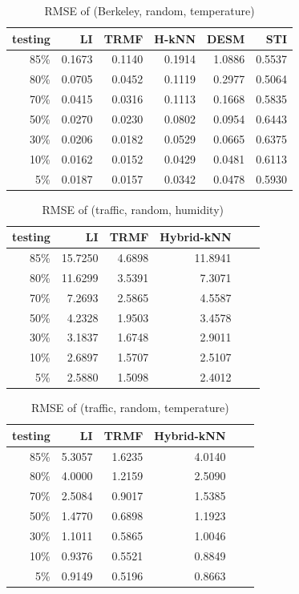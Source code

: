 \begin{table}[htbp]
\centering
\caption{RMSE of (Berkeley, random, temperature)}
\label{table:berkeley_random_tem}
\begin{tabular}{ r | r r r r r}
	testing	&LI	&TRMF	&H-kNN	&DESM	&STI\\ \hline
	85\%	&0.1673	&0.1140	&0.1914	&1.0886	&0.5537\\
	80\%	&0.0705	&0.0452	&0.1119	&0.2977	&0.5064\\
	70\%	&0.0415	&0.0316	&0.1113	&0.1668	&0.5835\\
	50\%	&0.0270	&0.0230	&0.0802	&0.0954	&0.6443\\
	30\%	&0.0206	&0.0182	&0.0529	&0.0665	&0.6375\\
	10\%	&0.0162	&0.0152	&0.0429	&0.0481	&0.6113\\
	 5\%	&0.0187	&0.0157	&0.0342	&0.0478	&0.5930\\
\end{tabular}
\end{table}

\begin{table} [htbp]
\centering
\caption{RMSE of (traffic, random, humidity)}
\label{table:traffic_random_hum}
\begin{tabular}{ r | r r r r r}
	testing	&LI	&TRMF	&Hybrid-kNN \\ \hline
	85\%	&15.7250	&4.6898	&11.8941\\ 
	80\%	&11.6299	&3.5391	&7.3071\\
	70\%	& 7.2693	&2.5865	&4.5587\\
	50\%	& 4.2328	&1.9503	&3.4578\\
	30\%	& 3.1837	&1.6748	&2.9011\\
	10\%	& 2.6897	&1.5707	&2.5107\\
	 5\%	& 2.5880	&1.5098	&2.4012\\
\end{tabular}
\end{table}

\begin{table} [htbp]
\centering
\caption{RMSE of (traffic, random, temperature)}
\label{table:traffic_random_tem}
\begin{tabular}{ r | r r r r r}
	testing	&LI	&TRMF	&Hybrid-kNN \\ \hline
	85\%	&5.3057	&1.6235	&4.0140\\ 
	80\%	&4.0000	&1.2159	&2.5090\\
	70\%	&2.5084	&0.9017	&1.5385\\
	50\%	&1.4770	&0.6898	&1.1923\\
	30\%	&1.1011	&0.5865	&1.0046\\
	10\%	&0.9376	&0.5521	&0.8849\\
	 5\%	&0.9149	&0.5196	&0.8663\\
\end{tabular}
\end{table}

